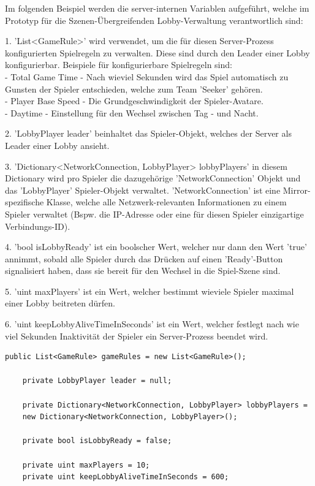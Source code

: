 Im folgenden Beispiel werden die server-internen Variablen aufgeführt, welche im Prototyp für die Szenen-Übergreifenden Lobby-Verwaltung verantwortlich sind:

1. 'List<GameRule>' wird verwendet, um die für diesen Server-Prozess konfigurierten Spielregeln zu verwalten. Diese sind durch den Leader einer Lobby konfigurierbar. Beispiele für konfigurierbare Spielregeln sind: \\
- Total Game Time - Nach wieviel Sekunden wird das Spiel automatisch zu Gunsten der Spieler entschieden, welche zum Team 'Seeker' gehören. \\
- Player Base Speed - Die Grundgeschwindigkeit der Spieler-Avatare. \\
- Daytime - Einstellung für den Wechsel zwischen Tag - und Nacht.

2. 'LobbyPlayer leader' beinhaltet das Spieler-Objekt, welches der Server als Leader einer Lobby ansieht.

3. 'Dictionary<NetworkConnection, LobbyPlayer> lobbyPlayers' in diesem Dictionary wird pro Spieler die dazugehörige 'NetworkConnection' Objekt und das 'LobbyPlayer' Spieler-Objekt verwaltet. 'NetworkConnection' ist eine Mirror-spezifische Klasse, welche alle Netzwerk-relevanten Informationen zu einem Spieler verwaltet (Bspw. die IP-Adresse oder eine für diesen Spieler einzigartige Verbindungs-ID).

4. 'bool isLobbyReady' ist ein boolscher Wert, welcher nur dann den Wert 'true' annimmt, sobald alle Spieler durch das Drücken auf einen 'Ready'-Button signalisiert haben, dass sie bereit für den Wechsel in die Spiel-Szene sind.

5. 'uint maxPlayers' ist ein Wert, welcher bestimmt wieviele Spieler maximal einer Lobby beitreten dürfen.

6. 'uint keepLobbyAliveTimeInSeconds' ist ein Wert, welcher festlegt nach wie viel Sekunden Inaktivität der Spieler ein Server-Prozess beendet wird.

\newpage

\begin{lstlisting}[caption= GameNetworkManager.cs Lobby Variables]
	public List<GameRule> gameRules = new List<GameRule>();
	
	private LobbyPlayer leader = null;
	
	private Dictionary<NetworkConnection, LobbyPlayer> lobbyPlayers = 
	new Dictionary<NetworkConnection, LobbyPlayer>();
	
	private bool isLobbyReady = false;
	
	private uint maxPlayers = 10;
	private uint keepLobbyAliveTimeInSeconds = 600;
\end{lstlisting}


